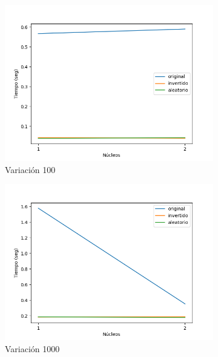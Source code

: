 \documentclass{article}
\begin{document}
\begin{figure}[h!]
\begin{subfigure}[b]{0.45\linewidth}
           \includegraphics[width=\linewidth]{Figure_1.(100).png}
           \caption{Variaci\'on 100}
           \label{fig:westminster_aerea}
        \end{subfigure}
        \begin{subfigure}[b]{0.45\linewidth}
           \includegraphics[width=\linewidth]{Figure_1.1(1000).png}
           \caption{Variaci\'on 1000}
           \label{fig:westminster_aerea}
        \end{subfigure}
      \begin{subfigure}[b]{0.45\linewidth}

\end{subfigure}
\end{figure}
\end{document}
